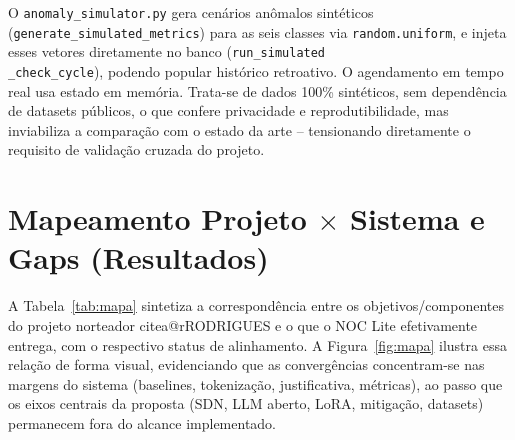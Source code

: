 \documentclass[12pt,a4paper]{article}
\makeatletter
\newcommand{\citea}[1]{\begingroup\edef\@currentlabel{\csname citea@#1\endcsname}\@currentlabel\endgroup}
\makeatother
\begin{document}
O \texttt{anomaly\_simulator.py} gera cenários anômalos sintéticos
(\texttt{generate\_simulated\_metrics}) para as seis classes via
\texttt{random.uniform}, e injeta esses vetores diretamente no banco
(\texttt{run\_simulated}\\\texttt{\_check\_cycle}), podendo popular histórico
retroativo. O agendamento em tempo real usa estado em memória. Trata-se de
dados 100\% sintéticos, sem dependência de datasets públicos, o que confere
privacidade e reprodutibilidade, mas inviabiliza a comparação com o estado da
arte -- tensionando diretamente o requisito de validação cruzada do projeto.

\section{Mapeamento Projeto $\times$ Sistema e Gaps (Resultados)}
\label{sec:mapeamento}

A Tabela~\ref{tab:mapa} sintetiza a correspondência entre os
objetivos/componentes do projeto norteador \citea{rRODRIGUES} e o que o NOC
Lite efetivamente entrega, com o respectivo status de alinhamento. A
Figura~\ref{fig:mapa} ilustra essa relação de forma visual, evidenciando que
as convergências concentram-se nas margens do sistema (baselines,
tokenização, justificativa, métricas), ao passo que os eixos centrais da
proposta (SDN, LLM aberto, LoRA, mitigação, datasets) permanecem fora do
alcance implementado.
\end{document}
